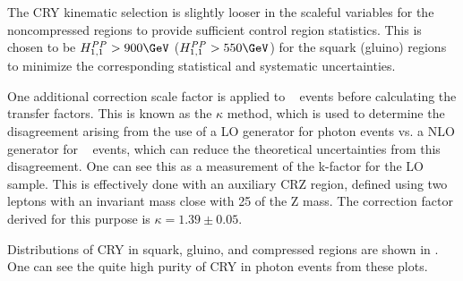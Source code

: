 The CRY kinematic selection is slightly looser in the scaleful variables for the noncompressed regions to provide sufficient control region statistics.
This is chosen to be $\HFnm{PP}{1}{1} > 900 \GeV$ ($\HFnm{PP}{1}{1} > 550 \GeV$) for the squark (gluino) regions to minimize the corresponding statistical and systematic uncertainties.
\begin{figure}[tbp]
\caption{} \label{fig:boson_pt_ratio}
\end{figure}

One additional correction scale factor is applied to \gammajets~ events before calculating the transfer factors.
This is known as the $\kappa$ method, which is used to determine the disagreement arising from the use of a LO generator for photon events vs. a NLO generator for \zjets~ events, which can reduce the theoretical uncertainties from this disagreement.
One can see this as a measurement of the k-factor for the LO \gammajets~ sample.
This is effectively done with an auxiliary CRZ region, defined using two leptons with an invariant mass close with 25 \GeV of the Z mass.
The correction factor derived for this purpose is $\kappa = 1.39 \pm 0.05$.

Distributions of CRY in squark, gluino, and compressed regions are shown in .
One can see the quite high purity of CRY in photon events from these plots.

